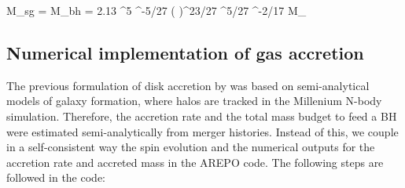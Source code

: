 \documentclass[a4,useAMS,usenatbib,usegraphicx,12pt]{article}
\begin{document}
{ M_{sg} = M_{bh} = 2.13 ^5 \epsilon^{-5/27} \left(  \right)^{23/27} 
\lambda^{5/27} \alpha^{-2/17} M_{\odot} }


\subsection{Numerical implementation of gas accretion}

The previous formulation of disk accretion by \citet{Fanidakis2011} was based on semi-analytical 
models of galaxy formation, where halos are tracked in the Millenium N-body simulation. Therefore, 
the accretion rate and the total mass budget to feed a BH were estimated semi-analytically from
merger histories. Instead of this, we couple in a self-consistent way the spin evolution and the 
numerical outputs for the accretion rate and accreted mass in the AREPO code. The following steps
are followed in the code:
\end{document}
